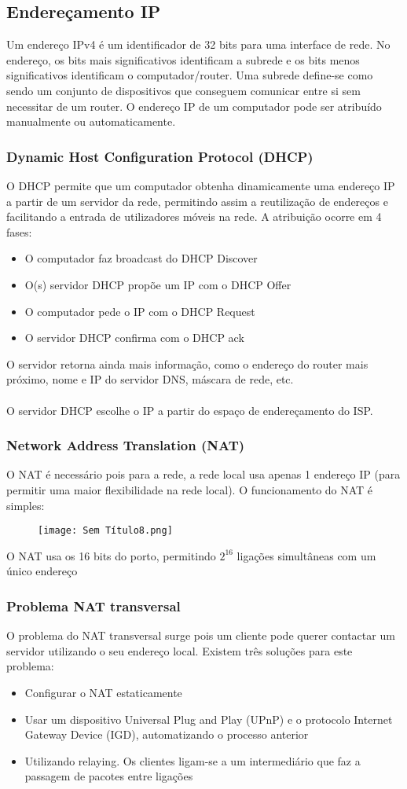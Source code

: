 \documentclass[10pt,a4paper]{report}
\begin{document}
\subsection{Endereçamento IP}
Um endereço IPv4 é um identificador de 32 bits para uma interface de rede. No endereço, os bits mais significativos identificam a subrede e os bits menos significativos identificam o computador/router. Uma subrede define-se como sendo um conjunto de dispositivos que conseguem comunicar entre si sem necessitar de um router. O endereço IP de um computador pode ser atribuído manualmente ou automaticamente.
\subsubsection{Dynamic Host Configuration Protocol (DHCP)}
O DHCP permite que um computador obtenha dinamicamente uma endereço IP a partir de um servidor da rede, permitindo assim a reutilização de endereços e facilitando a entrada de utilizadores móveis na rede. A atribuição ocorre em 4 fases:
\begin{itemize}
\item O computador faz broadcast do DHCP Discover
\item O(s) servidor DHCP propõe um IP com o DHCP Offer
\item O computador pede o IP com o DHCP Request
\item O servidor DHCP confirma com o DHCP ack
\end{itemize}
O servidor retorna ainda mais informação, como o endereço do router mais próximo, nome e IP do servidor DNS, máscara de rede, etc.\\
\\
O servidor DHCP escolhe o IP a partir do espaço de endereçamento do ISP.
\subsubsection{Network Address Translation (NAT)}
O NAT é necessário pois para a rede, a rede local usa apenas 1 endereço IP (para permitir uma maior flexibilidade na rede local). O funcionamento do NAT é simples:
\begin{figure}[H]
\centering
\texttt{[image: Sem Título8.png]}
\end{figure}
O NAT usa os 16 bits do porto, permitindo $2^{16}$ ligações simultâneas com um único endereço
\subsubsection{Problema NAT transversal}
O problema do NAT transversal surge pois um cliente pode querer contactar um servidor utilizando o seu endereço local. Existem três soluções para este problema:
\begin{itemize}
\item Configurar o NAT estaticamente
\item Usar um dispositivo Universal Plug and Play (UPnP) e o protocolo Internet Gateway Device (IGD), automatizando o processo anterior
\item Utilizando relaying. Os clientes ligam-se a um intermediário que faz a passagem de pacotes entre ligações
\end{itemize}
\end{document}
